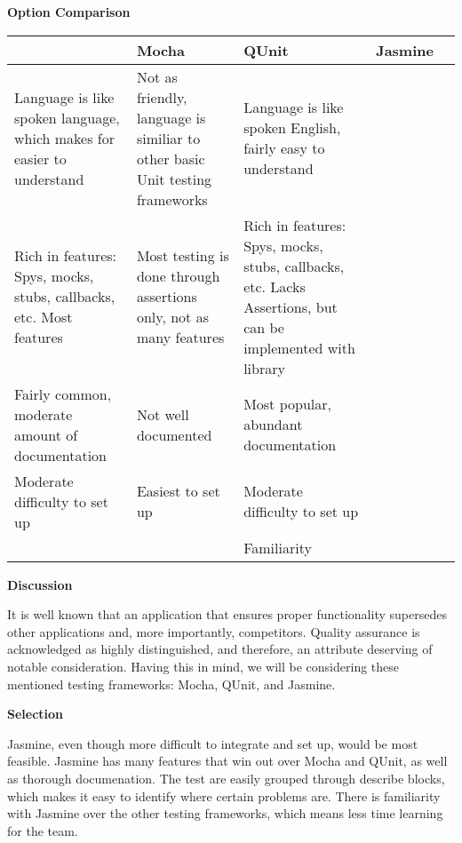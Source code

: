 \documentclass[letterpaper, 10pt, draftclsnofoot, compsoc, onecolumn]{IEEEtran}
\begin{document}
{{ \par}


\newpage
{\noindent\rmfamily\bfseries\color{black} Option Comparison \par}
\tablehead{}
\begin{supertabular}{|p{2cm}|p{2.5cm}|p{2.5cm}|p{2.5cm}|p{2.5cm}|}
\hline & Mocha & QUnit & Jasmine\\ \hline
Language is like spoken language, which makes for easier to understand & Not as friendly, language is similiar to other basic Unit testing frameworks & Language is like spoken English, fairly easy to understand\\ \hline
Rich in features: Spys, mocks, stubs, callbacks, etc. Most features & Most testing is done through assertions only, not as many features & Rich in features: Spys, mocks, stubs, callbacks, etc. Lacks Assertions, but can be implemented with library\\ \hline
Fairly common, moderate amount of documentation & Not well documented & Most popular, abundant documentation \\ \hline
Moderate difficulty to set up & Easiest to set up & Moderate difficulty to set up\\ \hline
&  & Familiarity\\ \hline
\end{supertabular}

\newpage
{\noindent\rmfamily\bfseries\color{black} Discussion \par}
{\noindent It is well known that an application that ensures proper functionality supersedes other applications and, more importantly, competitors. Quality assurance is acknowledged as highly distinguished, and therefore, an attribute deserving of notable consideration. Having this in mind, we will be considering these mentioned testing frameworks: Mocha, QUnit, and Jasmine. \par}

\medskip
{\noindent\rmfamily\bfseries\color{black} Selection \par}
{\noindent Jasmine, even though more difficult to integrate and set up, would be most feasible. Jasmine has many features that win out over Mocha and QUnit, as well as thorough documenation. The test are easily grouped through describe blocks, which makes it easy to identify where certain problems are. There is familiarity with Jasmine over the other testing frameworks, which means less time learning for the team.\par}

}
\end{document}
